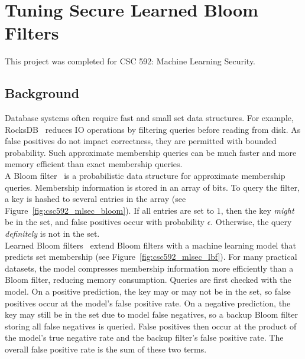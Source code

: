 \section{Tuning Secure Learned Bloom Filters}

This project was completed for CSC 592: Machine Learning Security.

\subsection{Background}

Database systems often require fast and small set data structures. For example, RocksDB~\cite{dong2021} reduces IO operations by filtering queries before 
reading from disk. As false positives do not impact correctness, they are permitted with bounded probability. Such approximate membership queries can be much
faster and more memory efficient than exact membership queries.  \\

\noindent
A Bloom filter~\cite{bloom1970} is a probabilistic data structure for approximate membership queries. Membership information is stored in an array of bits. To
query the filter, a key is hashed to several entries in the array (see Figure~\ref{fig:csc592_mlsec_bloom}). If all entries are set to $1$, then the key 
\emph{might} be in the set, and false positives occur with probability $\epsilon$. Otherwise, the query \emph{definitely} is not in the set. \\



\noindent
Learned Bloom filters~\cite{kraska2018} extend Bloom filters with a machine learning model that predicts set membership (see Figure~\ref{fig:csc592_mlsec_lbf}). 
For many practical datasets, the model compresses membership information more efficiently than a Bloom filter, reducing memory consumption. Queries are first 
checked with the model. On a positive prediction, the key may or may not be in the set, so false positives occur at the model's false positive rate. On a 
negative prediction, the key may still be in the set due to model false negatives, so a backup Bloom filter storing all false negatives is queried. False 
positives then occur at the product of the model's true negative rate and the backup filter's false positive rate. The overall false positive rate is the sum of
these two terms. \\

